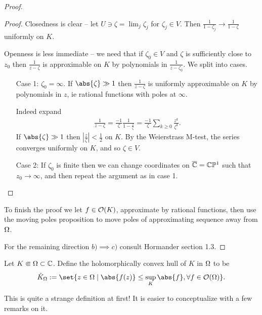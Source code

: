 \begin{proof}
\begin{itemize}
\begin{proof}
            Closedness is clear -- let $U \ni \zeta = \lim_j \zeta_j$ for $\zeta_j \in V$. Then $\frac{1}{1-\zeta_j} \to \frac{1}{1-\zeta}$ uniformly on $K$. 
            
            Openness is less immediate -- we need that if $\zeta_0 \in V$ and $\zeta$ is sufficiently close to $z_0$ then $\frac{1}{z-\zeta}$ is approximable on $K$ by polynomials in $\frac{1}{z-\zeta_0}$. We split into cases.
            \begin{itemize}
                \item[Case 1:] $\zeta_0 = \infty$. If $\abs{\zeta} \gg 1$ then $\frac{1}{z-\zeta} $ is uniformly approximable on $K$ by polynomials in $z$, ie rational functions with poles at $\infty$.

                Indeed expand
                \begin{align*}
                    \frac{1}{z-\zeta} = \frac{-1}{\zeta} \frac{1}{1-\frac{z}{\zeta}} = \frac{-1}{\zeta} \sum_{k \geq 0} \frac{z^k}{\zeta^k}.
                \end{align*}
                If $\abs{\zeta} \gg 1$ then $|\frac{z}{\zeta}| < \frac{1}{2}$ on $K$. By the Weierstrass M-test, the series converges uniformly on $K$, and so $\zeta \in V$.
                \item[Case 2:] If $\zeta_0$ is finite then we can change coordinates on $\overline{\mathbb{C}} = \mathbb{C} \mathbb{P}^1$ such that $z_0 \to \infty$, and then repeat the argument as in case 1. 
            \end{itemize}
        \end{proof}
        To finish the proof we let $f \in \mathcal{O}(K)$, approximate by rational functions, then use the moving poles proposition to move poles of approximating sequence away from $\Omega$.
    \end{itemize}

    For the remaining direction $b) \implies c)$ consult Hormander section 1.3.
\end{proof}

\begin{definition}
    Let $K \Subset \Omega \subset \mathbb{C}$. Define the holomorphically convex hull of $K $ in $\Omega$ to be
    \begin{align*}
        \hat{K}_{\om} := \set{ z \in \om \mid \abs{f(z)} \leq \sup_{K} \abs{f} , \forall f \in \O (\om)}.
    \end{align*}
\end{definition}

This is quite a strange definition at first! It is easier to conceptualize with a few remarks on it.


